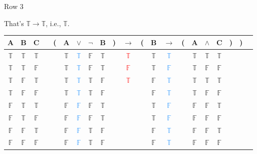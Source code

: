 \documentclass[
  ignorenonframetext,
]{beamer}
\renewcommand{\,}{\text{, }}
\def\True{\mathbb{T}}
\def\False{\mathbb{F}}
\begin{document}
\begin{frame}{Row 3}
\protect\hypertarget{row-3-1}{}

That's \(\True \rightarrow \True\), i.e., \(\True\).

\begin{center}
\bigskip
\begin{tabular}{@{ }c@{ }@{ }c@{ }@{ }c | c@{ }@{}c@{}@{ }c@{ }@{ }c@{ }@{ }c@{ }@{ }c@{ }@{}c@{}@{ }c@{ }@{}c@{}@{ }c@{ }@{ }c@{ }@{}c@{}@{ }c@{ }@{ }c@{ }@{ }c@{ }@{}c@{}@{}c@{}@{ }c}
A & B & C &  & ( & A & $\vee$ & $\neg$ & B & ) & $\rightarrow$ & ( & B & $\rightarrow$ & ( & A & $\wedge$ & C & ) & ) & \\
\hline 
 $\True$ & $\True$ & $\True$ &  &  & $\True$ & \textcolor{dodgerblue}{$\True$} & $\False$ & $\True$ &  &\textcolor{red}{$\True$}&  & $\True$ & \textcolor{dodgerblue}{$\True$} &  & $\True$ & $\True$ & $\True$ &  &  & \\
 $\True$ & $\True$ & $\False$ &  &  & $\True$ & \textcolor{dodgerblue}{$\True$} & $\False$ & $\True$ &  &\textcolor{red}{$\False$}&  & $\True$ & \textcolor{dodgerblue}{$\False$} &  & $\True$ & $\False$ & $\False$ &  &  & \\
 $\True$ & $\False$ & $\True$ &  &  & $\True$ & \textcolor{dodgerblue}{$\True$} & $\True$ & $\False$ &  &\textcolor{red}{$\True$}&  & $\False$ & \textcolor{dodgerblue}{$\True$} &  & $\True$ & $\True$ & $\True$ &  &  & \\
 $\True$ & $\False$ & $\False$ &  &  & $\True$ & \textcolor{dodgerblue}{$\True$} & $\True$ & $\False$ &  &&  & $\False$ & \textcolor{dodgerblue}{$\True$} &  & $\True$ & $\False$ & $\False$ &  &  & \\
 $\False$ & $\True$ & $\True$ &  &  & $\False$ & \textcolor{dodgerblue}{$\False$} & $\False$ & $\True$ &  &&  & $\True$ & \textcolor{dodgerblue}{$\False$} &  & $\False$ & $\False$ & $\True$ &  &  & \\
 $\False$ & $\True$ & $\False$ &  &  & $\False$ & \textcolor{dodgerblue}{$\False$} & $\False$ & $\True$ &  &&  & $\True$ & \textcolor{dodgerblue}{$\False$} &  & $\False$ & $\False$ & $\False$ &  &  & \\
 $\False$ & $\False$ & $\True$ &  &  & $\False$ & \textcolor{dodgerblue}{$\False$} & $\True$ & $\False$ &  &&  & $\False$ & \textcolor{dodgerblue}{$\True$} &  & $\False$ & $\False$ & $\True$ &  &  & \\
 $\False$ & $\False$ & $\False$ &  &  & $\False$ & \textcolor{dodgerblue}{$\False$} & $\True$ & $\False$ &  &&  & $\False$ & \textcolor{dodgerblue}{$\True$} &  & $\False$ & $\False$ & $\False$ &  &  & \\
\end{tabular}
\bigskip
\end{center}

\end{frame}
\end{document}
